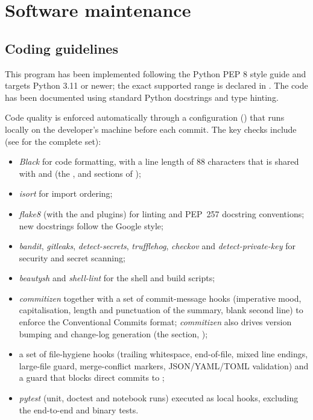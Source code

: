 \chapter{Software maintenance}

\section{Coding guidelines}

This program has been implemented following the Python PEP 8 style guide and targets Python 3.11
or newer; the exact supported range is declared in .
The code has been documented using standard Python docstrings and type hinting.

Code quality is enforced automatically through a  configuration
() that runs locally on the developer's machine before each commit.
The key checks include (see  for the complete set):

\begin{itemize}
\item \emph{Black} for code formatting, with a line length of 88 characters that is shared with
 and  (the ,  and 
sections of );
\item \emph{isort} for import ordering;
\item \emph{flake8} (with the  and  plugins) for linting
and PEP~257 docstring conventions; new docstrings follow the Google style;
\item \emph{bandit}, \emph{gitleaks}, \emph{detect-secrets}, \emph{trufflehog}, \emph{checkov} and
\emph{detect-private-key} for security and secret scanning;
\item \emph{beautysh} and \emph{shell-lint} for the shell and  build scripts;
\item \emph{commitizen} together with a set of commit-message hooks (imperative mood, capitalisation,
length and punctuation of the summary, blank second line) to enforce the Conventional Commits format;
\emph{commitizen} also drives version bumping and change-log generation (the 
section, );
\item a set of file-hygiene hooks (trailing whitespace, end-of-file, mixed line endings, large-file
guard, merge-conflict markers, JSON/YAML/TOML validation) and a  guard that
blocks direct commits to ;
\item \emph{pytest} (unit, doctest and notebook runs) executed as local hooks, excluding the
end-to-end and binary tests.
\end{itemize}

